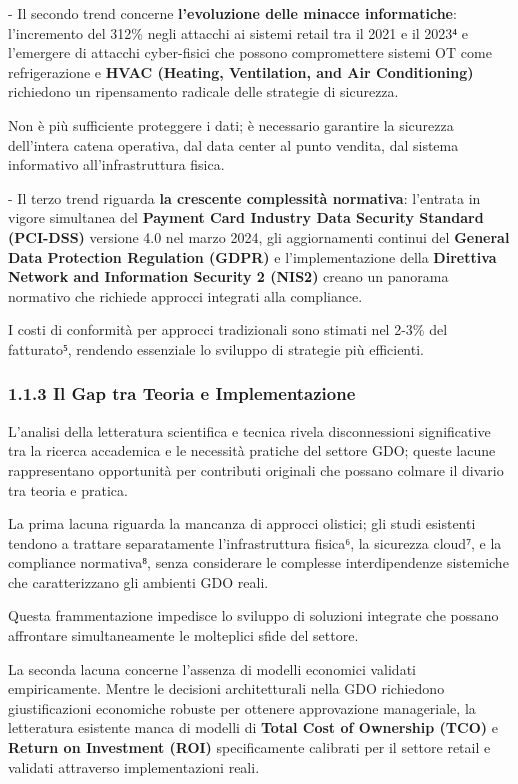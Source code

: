 \documentclass{report}
\begin{document}
- Il secondo trend concerne \textbf{l'evoluzione delle minacce
informatiche}: l'incremento del 312\% negli attacchi ai sistemi retail
tra il 2021 e il 2023⁴ e l'emergere di attacchi cyber-fisici che possono
compromettere sistemi OT come refrigerazione e \textbf{HVAC (Heating,
Ventilation, and Air Conditioning)} richiedono un ripensamento radicale
delle strategie di sicurezza.

Non è più sufficiente proteggere i dati; è necessario garantire la
sicurezza dell'intera catena operativa, dal data center al punto
vendita, dal sistema informativo all'infrastruttura fisica.

- Il terzo trend riguarda \textbf{la crescente complessità normativa}:
l'entrata in vigore simultanea del \textbf{Payment Card Industry Data
Security Standard (PCI-DSS)} versione 4.0 nel marzo 2024, gli
aggiornamenti continui del \textbf{General Data Protection Regulation
(GDPR)} e l'implementazione della \textbf{Direttiva Network and
Information Security 2 (NIS2)} creano un panorama normativo che richiede
approcci integrati alla compliance.

I costi di conformità per approcci tradizionali sono stimati nel 2-3\%
del fatturato⁵, rendendo essenziale lo sviluppo di strategie più
efficienti.

\subsubsection{\texorpdfstring{\textbf{1.1.3 Il Gap tra Teoria e
Implementazione}}{1.1.3 Il Gap tra Teoria e Implementazione}}\label{il-gap-tra-teoria-e-implementazione}

L'analisi della letteratura scientifica e tecnica rivela disconnessioni
significative tra la ricerca accademica e le necessità pratiche del
settore GDO; queste lacune rappresentano opportunità per contributi
originali che possano colmare il divario tra teoria e pratica.

La prima lacuna riguarda la mancanza di approcci olistici; gli studi
esistenti tendono a trattare separatamente l'infrastruttura fisica⁶, la
sicurezza cloud⁷, e la compliance normativa⁸, senza considerare le
complesse interdipendenze sistemiche che caratterizzano gli ambienti GDO
reali.

Questa frammentazione impedisce lo sviluppo di soluzioni integrate che
possano affrontare simultaneamente le molteplici sfide del settore.

La seconda lacuna concerne l'assenza di modelli economici validati
empiricamente. Mentre le decisioni architetturali nella GDO richiedono
giustificazioni economiche robuste per ottenere approvazione
manageriale, la letteratura esistente manca di modelli di \textbf{Total
Cost of Ownership (TCO)} e \textbf{Return on Investment (ROI)}
specificamente calibrati per il settore retail e validati attraverso
implementazioni reali.
\end{document}
